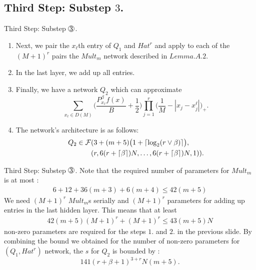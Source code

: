 \documentclass{if-beamer}
\DeclarePairedDelimiter{\ceil}{\lceil}{\rceil}
\newcommand*\circled[1]{\tikz[baseline=(char.base)]{
            \node[shape=circle,draw,inner sep=0.2pt] (char) {#1};}}
\begin{document}
\subsection{Third Step: Substep $3$.}
\begin{frame}{Third Step: Substep $\circled{3}$.}
\begin{enumerate}
    \item Next, we pair the $x_{\ell}$th entry of $Q_{1}$ and $Hat^{r}$ and apply to each of the $(M+1)^{r}$ pairs the $Mult_m$ network described in $Lemma.A.2.$
    \item In the last layer, we add up all entries.
    \item Finally, we have a network $Q_{2}$ which can approximate
    \begin{equation*}
        \sum_{x_{\ell}\in D(M)}\bigg( \frac{P_{x_{\ell}}^{\beta}f(x)}{B}+\frac{1}{2}\bigg)\prod_{j=1}^{r}\bigg( \frac{1}{M} - |x_{j}-x_{j}^{\ell}| \bigg)_{+}.
    \end{equation*}
    \item The network's architecture is as follows:
    \begin{align*}
        Q_{2} \in \mathcal{F}&(3+(m+5) \big( 1 + \ceil{\log_{2}(r \vee \beta)} \big),\\
            &(r,6(r+\ceil{\beta})N,\dots,6(r+\ceil{\beta})N,1)).
    \end{align*}
\end{enumerate}
\end{frame}

\begin{frame}{Third Step: Substep $\circled{3}$.}
    Note that the required number of parameters for $Mult_{m}$ is at most :
    \begin{align*}
        6+12+36(m+3)+6(m+4) \leq 42(m+5)
    \end{align*}
    We need $(M+1)^{r}$ $Mult_{m}$s serially and $(M+1)^{r}$ parameters for adding up entries in the last hidden layer.
    This means that at least 
    \begin{align*}
         42(m+5)(M+1)^{r}+(M+1)^{r} \leq 43(m+5)N
    \end{align*}
    non-zero parameters are required for the steps $1.$ and $2.$ in the previous slide.
    By combining the bound we obtained for the number of non-zero parameters for $(Q_{1},Hat^{r})$ network, the $s$ for $Q_2$ is bounded by :
    \begin{equation*}
        141(r+\beta+1)^{3+r}N(m+5).
    \end{equation*}
\end{frame}
    
\end{document}

